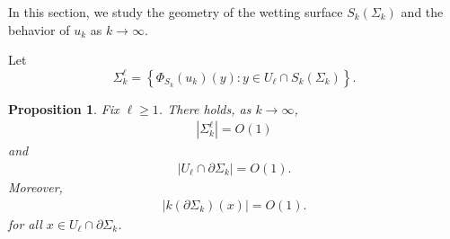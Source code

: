 \documentclass[11pt]{amsart}
\newtheorem{prop}{Proposition}
\begin{document}
In this section, we study the geometry of the wetting surface $S_k(\Sigma_k)$ and the behavior of $u_k$ as $k\to\infty$. 

Let $$\Sigma_k^\ell=\left\{\Phi_{S_k}(u_k)(y):y\in U_{\ell}\cap  S_k(\Sigma_k)\right\}.$$

	
	\begin{prop} Fix $\ell \geq 1$. \label{estimates} 
		There holds, as $k\to\infty$,
		\begin{align}
			|\Sigma^\ell_k|=O(1)\label{area}
		\end{align}
		and
			\begin{align} 
			|U_\ell\cap\partial \Sigma_k|=O(1) \label{length}.
		\end{align}  
	Moreover,   
		\begin{align}
			|k( \partial \Sigma_k)(x)|=O(1). \label{g curvature}
		\end{align} 
 for all    $x\in U_\ell\cap \partial \Sigma_k$.	
	\end{prop}
\end{document}
